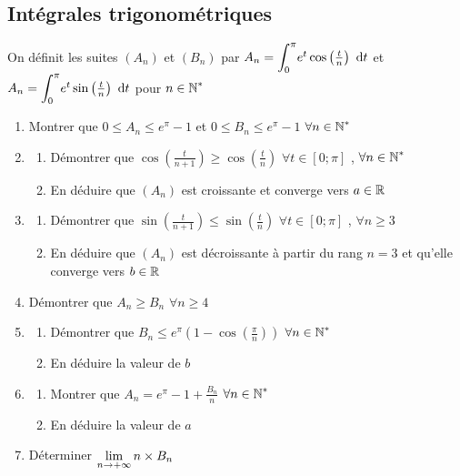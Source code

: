\documentclass[oneside,12pt]{book}          %
\begin{document}
\subsection{Intégrales trigonométriques}
On définit les suites $(A_n)$ et $(B_n)$ par $A_n={\displaystyle\int_{0}^{\pi}}e^t\cos\left(\frac{t}{n}\right){\,\,\mathrm{d}} t$ et $A_n={\displaystyle\int_{0}^{\pi}}e^t\sin\left(\frac{t}{n}\right){\,\,\mathrm{d}} t$ \quad pour ${n\in\mathbb N}^*$
\begin{enumerate}\setlength{\itemsep}{0pt}
    \item Montrer que $0\leq A_n\leq e^\pi-1$ \quad et \quad $0\leq B_n\leq e^\pi-1$ \quad $\forall{n\in\mathbb N}^*$
    \item \begin{enumerate}
        \item Démontrer que $\cos\left(\frac{t}{n+1}\right)\geq\cos\left(\frac{t}{n}\right)$ \quad $\forall t\in[0;\pi]$ , \quad $\forall{n\in\mathbb N}^*$
        \item En déduire que $(A_n)$ est croissante et converge vers $a\in{\mathbb R}$
    \end{enumerate}
    \item \begin{enumerate}
        \item Démontrer que $\sin\left(\frac{t}{n+1}\right)\leq\sin\left(\frac{t}{n}\right)$ \quad $\forall t\in[0;\pi]$ , \quad $\forall n\geq3$
        \item En déduire que $(A_n)$ est décroissante à partir du rang $n=3$ et qu'elle converge vers $b\in{\mathbb R}$
    \end{enumerate}
    \item Démontrer que $A_n\geq B_n$ \quad $\forall n\geq 4$
    \item \begin{enumerate}
        \item Démontrer que $B_n\leq e^\pi\left(1-\cos\left(\frac{\pi}{n}\right)\right)$ \quad $\forall{n\in\mathbb N}^*$
        \item En déduire la valeur de $b$
    \end{enumerate}
    \item \begin{enumerate}
        \item Montrer que $A_n=e^\pi-1+\frac{B_n}{n}$ \quad $\forall{n\in\mathbb N}^*$
        \item En déduire la valeur de $a$
    \end{enumerate}
    \item[$\dur$] Déterminer ${\lim\limits_{n\to +\infty}}\, n\times B_n$ 
\end{enumerate}
\end{document}
